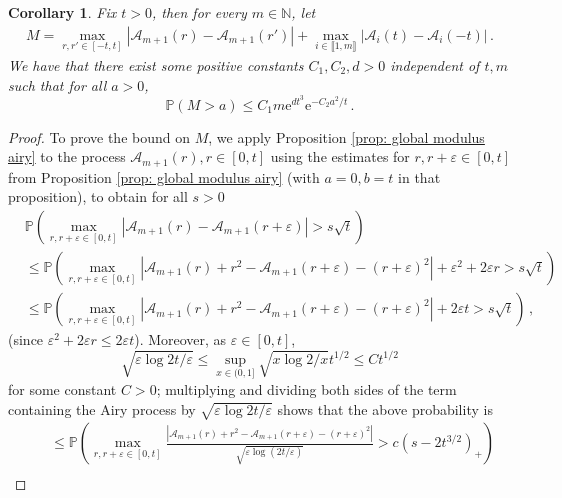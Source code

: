 \documentclass[11pt, reqno]{amsart}
\numberwithin{equation}{section}
\newcounter{dummy} \numberwithin{dummy}{section}
\newtheorem{corollary}[dummy]{Corollary}
\newcommand{\N}{\ensuremath{\mathbb{N}}}
\newcommand{\PP}{\ensuremath{\mathbb{P}}}
\begin{document}
\begin{corollary}\label{cor: global mod airy M}
    Fix $t > 0$, then for every $m \in \N$, let
    \begin{align*}
    M = \max_{r, r' \in [-t, t]} |\mathcal{A}_{m+1}(r) - \mathcal{A}_{m+1}(r')| + \max_{i \in \llbracket 1, m\rrbracket } |\mathcal{A}_i(t) - \mathcal{A}_i(-t)|\,.
	\end{align*}
    We have that there exist some positive constants $C_1, C_2,d > 0$ independent of $t, m$ such that for all $a>0$,
     \begin{equation*}
     \PP(M > a) \le C_1 m \mathrm{e}^{dt^3} \mathrm{e}^{-C_2 a^2/t}\,.
     \end{equation*}
\end{corollary}
\begin{proof}
    To prove the bound on $M$, we apply Proposition \ref{prop: global modulus airy} to the process $\mathcal{A}_{m+1}(r), r \in [0, t]$ using the estimates for $r, r+\varepsilon\in [0,t]$ from Proposition \ref{prop: global modulus airy} (with $a = 0, b = t$ in that proposition), to obtain for all $s> 0$
    \begin{align*}
    &\displaystyle\PP\left(\max_{r,r+\varepsilon\in [0,t]}|\mathcal{A}_{m+1}(r) - \mathcal{A}_{m+1}(r + \varepsilon)|> s\sqrt{t}\right)\\
    &\le \displaystyle\PP\left(\max_{r,r+\varepsilon\in [0,t]}|\mathcal{A}_{m+1}(r) + r^2 - \mathcal{A}_{m+1}(r + \varepsilon)-(r+\varepsilon)^2| + \varepsilon^2 + 2\varepsilon r > s\sqrt{t}\right)\\
    &\le \displaystyle\PP\left(\max_{r,r+\varepsilon\in [0,t]}|\mathcal{A}_{m+1}(r) + r^2 - \mathcal{A}_{m+1}(r + \varepsilon)-(r+\varepsilon)^2| + 2\varepsilon t > s\sqrt{t}\right)\,,
    \end{align*}
    (since $\varepsilon^2 + 2\varepsilon r \le 2\varepsilon t$). Moreover, as $\varepsilon \in [0,t]$,
    \begin{equation*}
    \sqrt{\varepsilon\log 2t/\varepsilon}\le \displaystyle\sup_{x\in (0,1]}\sqrt{x\log2/x} t^{1/2} \le Ct^{1/2}
    \end{equation*}
    for some constant $C>0$;
    multiplying and dividing both sides of the term containing the Airy process by $\sqrt{\varepsilon\log 2t/\varepsilon}$ shows that the above probability is
    \begin{align*} 
    & \quad \le  \displaystyle\PP\left(\max_{r,r+\varepsilon\in [0,t]}\frac{|\mathcal{A}_{m+1}(r) + r^2 - \mathcal{A}_{m+1}(r + \varepsilon)-(r+\varepsilon)^2|}{\sqrt{\varepsilon\log(2t/\varepsilon)}} > c(s- 2t^{3/2})_+\right)\\

\end{align*}
\end{proof}
\end{document}
